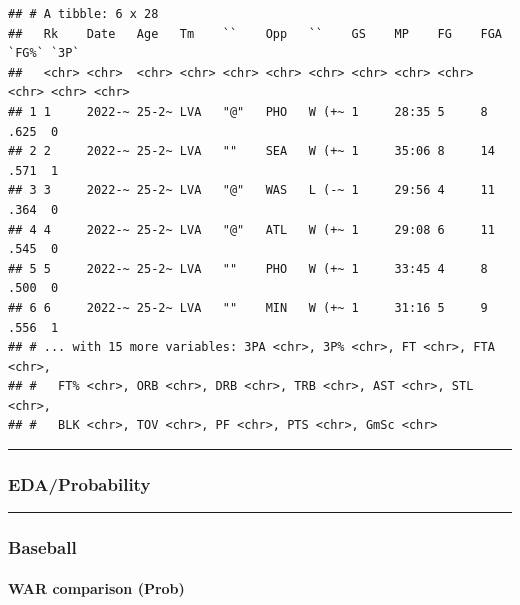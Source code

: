 \documentclass[]{article}
\newenvironment{Shaded}{\begin{snugshade}}{\end{snugshade}}
\newcommand{\CommentTok}[1]{\textcolor[rgb]{0.56,0.35,0.01}{\textit{#1}}}
\let\oldparagraph\paragraph
\renewcommand{\paragraph}[1]{\oldparagraph{#1}\mbox{}}
\begin{document}
\begin{verbatim}
## # A tibble: 6 x 28
##   Rk    Date   Age   Tm    ``    Opp   ``    GS    MP    FG    FGA   `FG%` `3P` 
##   <chr> <chr>  <chr> <chr> <chr> <chr> <chr> <chr> <chr> <chr> <chr> <chr> <chr>
## 1 1     2022-~ 25-2~ LVA   "@"   PHO   W (+~ 1     28:35 5     8     .625  0    
## 2 2     2022-~ 25-2~ LVA   ""    SEA   W (+~ 1     35:06 8     14    .571  1    
## 3 3     2022-~ 25-2~ LVA   "@"   WAS   L (-~ 1     29:56 4     11    .364  0    
## 4 4     2022-~ 25-2~ LVA   "@"   ATL   W (+~ 1     29:08 6     11    .545  0    
## 5 5     2022-~ 25-2~ LVA   ""    PHO   W (+~ 1     33:45 4     8     .500  0    
## 6 6     2022-~ 25-2~ LVA   ""    MIN   W (+~ 1     31:16 5     9     .556  1    
## # ... with 15 more variables: 3PA <chr>, 3P% <chr>, FT <chr>, FTA <chr>,
## #   FT% <chr>, ORB <chr>, DRB <chr>, TRB <chr>, AST <chr>, STL <chr>,
## #   BLK <chr>, TOV <chr>, PF <chr>, PTS <chr>, GmSc <chr>
\end{verbatim}

\begin{Shaded}
\end{Shaded}

\begin{center}\rule{0.5\linewidth}{\linethickness}\end{center}

\hypertarget{edaprobability}{%
\subsubsection{EDA/Probability}\label{edaprobability}}

\begin{center}\rule{0.5\linewidth}{\linethickness}\end{center}

\hypertarget{baseball}{%
\subsubsection{Baseball}\label{baseball}}

\hypertarget{war-comparison-prob}{%
\paragraph{WAR comparison (Prob)}\label{war-comparison-prob}}
\end{document}
